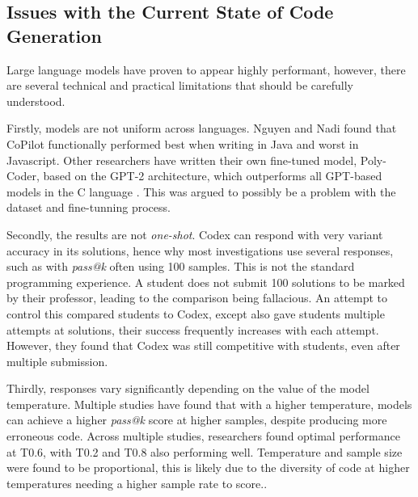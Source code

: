 \documentclass[manuscript,screen,review,sigconf]{acmart}
\begin{document}
\subsection{Issues with the Current State of Code Generation}
 Large language models have proven to appear highly performant, however, there are several technical and practical limitations that should be carefully understood.

Firstly, models are not uniform across languages. Nguyen and Nadi \cite{CopilotSuggestionsEval} found that CoPilot functionally performed best when writing in Java and worst in Javascript. Other researchers have written their own fine-tuned model, Poly-Coder, based on the GPT-2 architecture, which outperforms all GPT-based models in the C language \cite{SysEvaOfLLMofCode}. This was argued to possibly be a problem with the dataset and fine-tunning process.

Secondly, the results are not \textit{one-shot}. Codex can respond with very variant accuracy in its solutions, hence why most investigations use several responses, such as with \textit{pass@k} often using 100 samples. This is not the standard programming experience. A student does not submit 100 solutions to be marked by their professor, leading to the comparison being fallacious. An attempt to control this compared students to Codex, except also gave students multiple attempts at solutions, their success frequently increases with each attempt. However, they found that Codex was still competitive with students, even after
 multiple submission\cite{Codex_CS1_CS2_Test}.

Thirdly, responses vary significantly depending on the value of the model temperature. Multiple studies have found that with a higher temperature, models can achieve a higher \textit{pass@k} score at higher samples, despite producing more erroneous code. Across multiple studies, researchers found optimal performance at T0.6, with T0.2 and T0.8 also performing well. Temperature and sample size were found to be proportional, this is likely due to the diversity of code at higher temperatures needing a higher sample rate to score.\cite{stackOVerflowAndTemperature, SysEvaOfLLMofCode, CodexRelPaper}.
\end{document}
